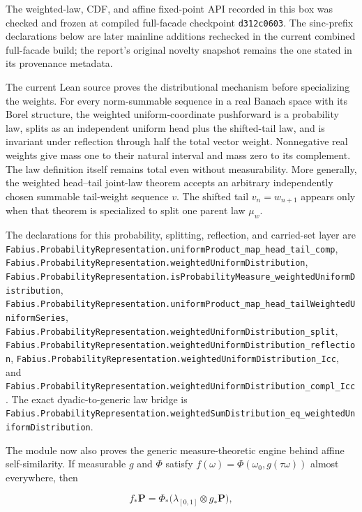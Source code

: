 \documentclass[11pt,oneside]{article}
\theoremstyle{definition}
\theoremstyle{remark}
\newcommand{\1}{\mathbf 1}
\begin{document}
\begin{statusbox}
The weighted-law, CDF, and affine fixed-point API recorded in this box was checked and
frozen at compiled full-facade checkpoint \texttt{d312c0603}.  The sinc-prefix declarations
below are later mainline additions rechecked in the current combined full-facade build; the
report's original novelty snapshot remains the one stated in its provenance metadata.

The current Lean source proves the distributional mechanism before specializing the
weights.  For every norm-summable sequence in a real Banach space with its Borel
structure, the weighted uniform-coordinate pushforward is a probability law, splits as
an independent uniform head plus the shifted-tail law, and is invariant under reflection
through half the total vector weight.  Nonnegative real weights give mass one to their
natural interval and mass zero to its complement.  The law definition itself remains
total even without measurability.  More generally, the weighted head--tail joint-law
theorem accepts an arbitrary independently chosen summable tail-weight sequence \(v\).
The shifted tail \(v_n=w_{n+1}\) appears only when that theorem is specialized to split
one parent law \(\mu_w\).

The declarations for this probability, splitting, reflection, and carried-set layer are
\nolinkurl{Fabius.ProbabilityRepresentation.uniformProduct_map_head_tail_comp},
\nolinkurl{Fabius.ProbabilityRepresentation.weightedUniformDistribution},
\nolinkurl{Fabius.ProbabilityRepresentation.isProbabilityMeasure_weightedUniformDistribution},
\nolinkurl{Fabius.ProbabilityRepresentation.uniformProduct_map_head_tailWeightedUniformSeries},
\nolinkurl{Fabius.ProbabilityRepresentation.weightedUniformDistribution_split},
\nolinkurl{Fabius.ProbabilityRepresentation.weightedUniformDistribution_reflection},
\nolinkurl{Fabius.ProbabilityRepresentation.weightedUniformDistribution_Icc}, and
\nolinkurl{Fabius.ProbabilityRepresentation.weightedUniformDistribution_compl_Icc}.
The exact dyadic-to-generic law bridge is
\nolinkurl{Fabius.ProbabilityRepresentation.weightedSumDistribution_eq_weightedUniformDistribution}.

The module now also proves the generic measure-theoretic engine behind affine
self-similarity.  If measurable \(g\) and \(\Phi\) satisfy
\(f(\omega)=\Phi(\omega_0,g(\tau\omega))\) almost everywhere, then

\[
 f_*\mathbf P=\Phi_*\bigl(\lambda_{[0,1]}\otimes g_*\mathbf P\bigr),
\]


\end{statusbox}
\end{document}
